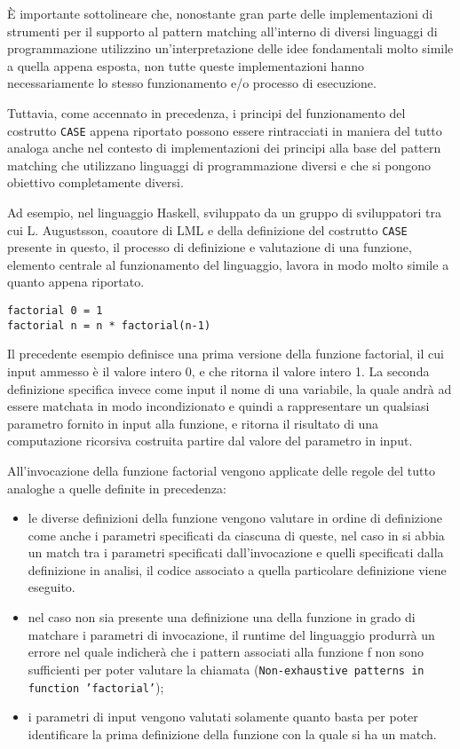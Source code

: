 È importante sottolineare che, nonostante gran parte delle implementazioni di
strumenti per il supporto al pattern matching all’interno di diversi linguaggi
di programmazione utilizzino un’interpretazione delle idee fondamentali molto
simile a quella appena esposta, non tutte queste implementazioni hanno
necessariamente lo stesso funzionamento e/o processo di esecuzione.

Tuttavia, come accennato in precedenza, i principi del funzionamento del
costrutto \texttt{CASE} appena riportato possono essere rintracciati in maniera
del tutto analoga anche nel contesto di implementazioni dei principi alla base
del pattern matching che utilizzano linguaggi di programmazione diversi e che
si pongono obiettivo completamente diversi.

Ad esempio, nel linguaggio Haskell, sviluppato da un gruppo di sviluppatori tra
cui L. Augustsson, coautore di LML e della definizione del costrutto
\texttt{CASE} presente in questo, il processo di definizione e valutazione di
una funzione, elemento centrale al funzionamento del linguaggio, lavora in modo
molto simile a quanto appena riportato.

\begin{lstlisting}[caption=Esempio di definizione di una funzione semplificata
  per il calcolo del fattoriale utilizzando il linguaggio Haskell.]
factorial 0 = 1
factorial n = n * factorial(n-1)
\end{lstlisting}

Il precedente esempio definisce una prima versione della funzione factorial, il
cui input ammesso è il valore intero 0, e che ritorna il valore intero 1. La
seconda definizione specifica invece come input il nome di una variabile, la
quale andrà ad essere matchata in modo incondizionato e quindi a rappresentare
un qualsiasi parametro fornito in input alla funzione, e ritorna il risultato
di una computazione ricorsiva costruita partire dal valore del parametro in
input.

All’invocazione della funzione factorial vengono applicate delle regole del
tutto analoghe a quelle definite in precedenza:

\begin{itemize}
\item le diverse definizioni della funzione vengono valutare in ordine di
  definizione come anche i parametri specificati da ciascuna di queste, nel
  caso in si abbia un match tra i parametri specificati dall'invocazione e
  quelli specificati dalla definizione in analisi, il codice associato a quella
  particolare definizione viene eseguito.
\item nel caso non sia presente una definizione una della funzione in grado di
  matchare i parametri di invocazione, il runtime del linguaggio produrrà un
  errore nel quale indicherà che i pattern associati alla funzione f non sono
  sufficienti per poter valutare la chiamata (\texttt{Non-exhaustive patterns
  in function 'factorial'});
\item i parametri di input vengono valutati solamente quanto basta per poter
  identificare la prima definizione della funzione con la quale si ha un match.
\end{itemize}

